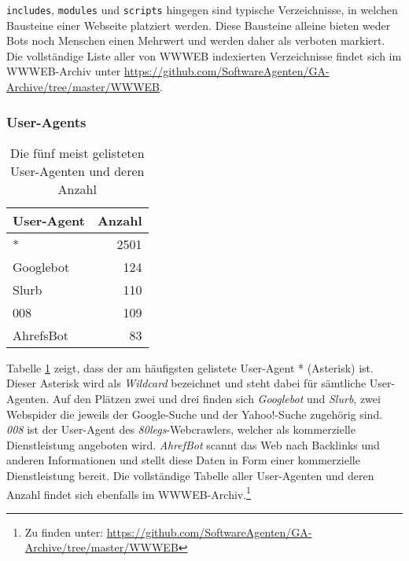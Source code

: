 \texttt{includes}, \texttt{modules} und \texttt{scripts} hingegen sind typische
Verzeichnisse, in welchen Bausteine einer Webseite platziert werden. Diese
Bausteine alleine bieten weder Bots noch Menschen einen Mehrwert und werden
daher als verboten markiert. Die vollständige Liste aller von WWWEB indexierten
Verzeichnisse findet sich im WWWEB-Archiv unter
\url{https://github.com/SoftwareAgenten/GA-Archive/tree/master/WWWEB}.

\subsubsection{User-Agents}
\label{ssub:user-agents}

\begin{table}[h]
  \begin{tabular}{ l|r }
    \textbf{User-Agent} & \textbf{Anzahl}\\
    \hline
    *         & 2501 \\
    Googlebot & 124  \\
    Slurb     & 110  \\
    008       & 109  \\
    AhrefsBot & 83   \\
  \end{tabular}
  
  \caption{Die fünf meist gelisteten User-Agenten und deren Anzahl}
  \label{tab:maxUA}
\end{table}

Tabelle \ref{tab:maxUA} zeigt, dass der am häufigsten gelistete User-Agent *
(Asterisk) ist. Dieser Asterisk wird als \emph{Wildcard} bezeichnet und steht
dabei für sämtliche User-Agenten. Auf den Plätzen zwei und drei finden sich
\emph{Googlebot} und \emph{Slurb}, zwei Webspider die
jeweils der Google-Suche und der Yahoo!-Suche zugehörig sind. \emph{008} ist
der User-Agent des \emph{80legs}-Webcrawlers, welcher als kommerzielle
Dienstleistung angeboten wird. \emph{AhrefBot} scannt das Web nach Backlinks
und anderen Informationen und stellt diese Daten in Form einer kommerzielle
Dienstleistung bereit. Die vollständige Tabelle aller User-Agenten und deren
Anzahl findet sich ebenfalls im WWWEB-Archiv.\footnote{Zu finden unter:
\url{https://github.com/SoftwareAgenten/GA-Archive/tree/master/WWWEB}}
